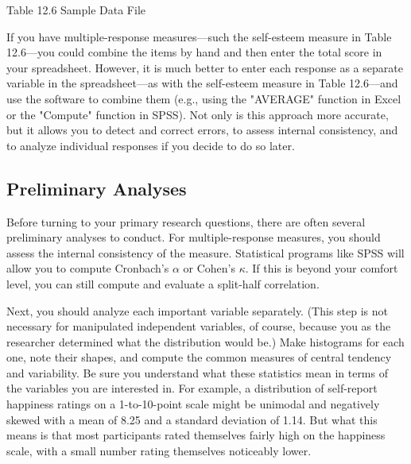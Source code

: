 Table 12.6 Sample Data File

If you have multiple-response measures---such the self-esteem measure in Table 12.6---you could combine the items by hand and then enter the total score in your spreadsheet. However, it is much better to enter each response as a separate variable in the spreadsheet---as with the self-esteem measure in Table 12.6---and use the software to combine them (e.g., using the "AVERAGE" function in Excel or the "Compute" function in SPSS). Not only is this approach more accurate, but it allows you to detect and correct errors, to assess internal consistency, and to analyze individual responses if you decide to do so later.

\subsection{Preliminary Analyses}

Before turning to your primary research questions, there are often several preliminary analyses to conduct. For multiple-response measures, you should assess the internal consistency of the measure. Statistical programs like SPSS will allow you to compute Cronbach's $\alpha$ or Cohen's $\kappa$. If this is beyond your comfort level, you can still compute and evaluate a split-half correlation.

Next, you should analyze each important variable separately. (This step is not necessary for manipulated independent variables, of course, because you as the researcher determined what the distribution would be.) Make histograms for each one, note their shapes, and compute the common measures of central tendency and variability. Be sure you understand what these statistics mean in terms of the variables you are interested in. For example, a distribution of self-report happiness ratings on a 1-to-10-point scale might be unimodal and negatively skewed with a mean of 8.25 and a standard deviation of 1.14. But what this means is that most participants rated themselves fairly high on the happiness scale, with a small number rating themselves noticeably lower.

